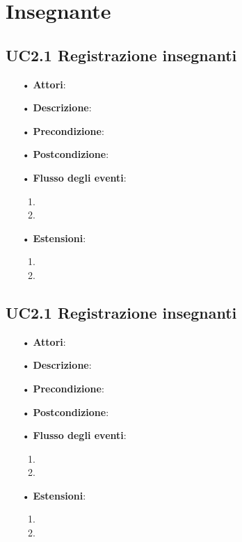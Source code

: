 
\section{Insegnante}

\subsection{UC2.1 Registrazione insegnanti}

\begin{itemize}
	\item[•] \textbf{Attori}: 
	\item[•] \textbf{Descrizione}:
	\item[•] \textbf{Precondizione}:
	\item[•] \textbf{Postcondizione}:
	\item[•] \textbf{Flusso degli eventi}:
		\begin{enumerate}
			\item
			\item
		\end{enumerate}
	\item[•] \textbf{Estensioni}:
		\begin{enumerate}
			\item
			\item
		\end{enumerate}
\end{itemize}

\subsection{UC2.1 Registrazione insegnanti}
\begin{itemize}
	\item[•] \textbf{Attori}: 
	\item[•] \textbf{Descrizione}:
	\item[•] \textbf{Precondizione}:
	\item[•] \textbf{Postcondizione}:
	\item[•] \textbf{Flusso degli eventi}:
		\begin{enumerate}
			\item
			\item
		\end{enumerate}
	\item[•] \textbf{Estensioni}:
		\begin{enumerate}
			\item
			\item
		\end{enumerate}
\end{itemize}

